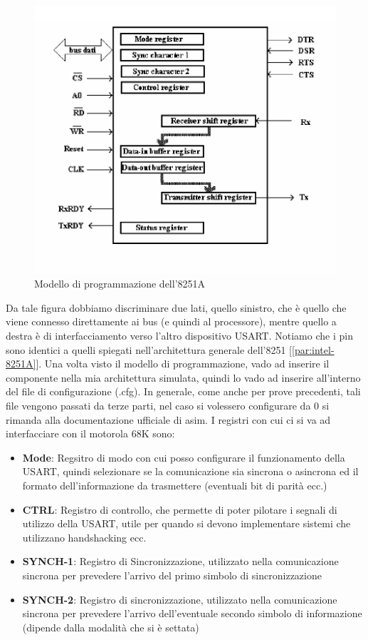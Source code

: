 \begin{figure}
    \centering
    \includegraphics[width=.5\textwidth]{img/prog-8251A.png}
    \caption{Modello di programmazione dell'8251A}\label{img:prog-8251A}
\end{figure}

Da tale figura dobbiamo discriminare due lati, quello sinistro, che è quello che viene connesso direttamente ai bus (e quindi al processore), mentre quello a destra è di interfacciamento verso l'altro dispositivo USART.
Notiamo che i pin sono identici a quelli spiegati nell'architettura generale dell'8251 [\ref{par:intel-8251A}].
Una volta visto il modello di programmazione, vado ad inserire il componente nella mia architettura simulata, quindi lo vado ad inserire all'interno del file di configurazione (.cfg). In generale, come anche per prove precedenti, tali file vengono passati da terze parti, nel caso si volessero configurare da 0 si rimanda alla documentazione ufficiale di asim.
I registri con cui ci si va ad interfacciare con il motorola 68K sono:
\begin{itemize}
    \item \textbf{Mode}: Regsitro di modo con cui posso configurare il funzionamento della USART, quindi selezionare se la comunicazione sia sincrona o asincrona ed il formato dell'informazione da trasmettere (eventuali bit di parità ecc.)
    \item \textbf{CTRL}: Registro di controllo, che permette di poter pilotare i segnali di utilizzo della USART, utile per quando si devono implementare sistemi che utilizzano handshacking ecc.
    \item \textbf{SYNCH-1}: Registro di Sincronizzazione, utilizzato nella comunicazione sincrona per prevedere l'arrivo del primo simbolo di sincronizzazione
    \item \textbf{SYNCH-2}: Registro di sincronizzazione, utilizzato nella comunicazione sincrona per prevedere l'arrivo dell'eventuale secondo simbolo di informazione (dipende dalla modalità che si è settata)
\end{itemize}


